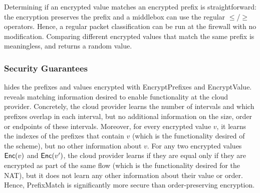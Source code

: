 \begin{framed}
\end{framed}



Determining if an encrypted value matches an encrypted prefix is straightforward: the encryption preserves the prefix and a middlebox can use the regular $\le$/$\ge$ operators.
Hence, a regular packet classification can be run at the firewall with no modification. Comparing different encrypted values that match the same prefix is meaningless, and returns a random value.



\subsubsection{Security Guarantees}
\label{sec:buildingblocks:guarantees}

\pmatch{} hides the  prefixes and values encrypted with EncryptPrefixes and EncryptValue. \pmatch{} reveals  matching information desired to enable functionality at the cloud provider.  Concretely, the cloud provider learns the number of intervals and which prefixes overlap in each interval, but no additional information on the size, order or endpoints of these intervals. Moreover, for every encrypted value $v$, it learns the indexes of the prefixes that contain $v$ (which is the functionality desired of the scheme), but no other information about $v$. For any two encrypted values $\mathsf{Enc}(v)$ and $\mathsf{Enc}(v')$, the cloud provider learns if they are equal only if they are encrypted as part of the same flow (which is the functionality desired for the NAT), but it does not learn any other information about their value or  order.  Hence, PrefixMatch is significantly more secure than order-preserving encryption.

